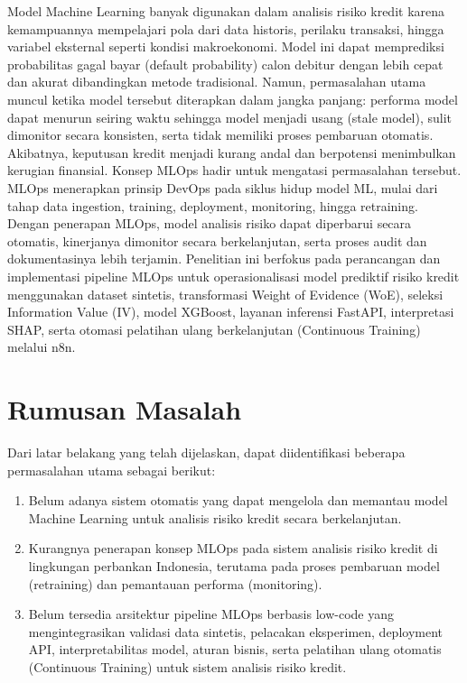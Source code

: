 Model Machine Learning banyak digunakan dalam analisis risiko kredit karena kemampuannya mempelajari pola dari data historis, perilaku transaksi, hingga variabel eksternal seperti kondisi makroekonomi. Model ini dapat memprediksi probabilitas gagal bayar (default probability) calon debitur dengan lebih cepat dan akurat dibandingkan metode tradisional.\cite{mlopsfinance2025} Namun, permasalahan utama muncul ketika model tersebut diterapkan dalam jangka panjang: performa model dapat menurun seiring waktu sehingga model menjadi usang (stale model), sulit dimonitor secara konsisten, serta tidak memiliki proses pembaruan otomatis. Akibatnya, keputusan kredit menjadi kurang andal dan berpotensi menimbulkan kerugian finansial. Konsep MLOps hadir untuk mengatasi permasalahan tersebut. MLOps menerapkan prinsip DevOps pada siklus hidup model ML, mulai dari tahap data ingestion, training, deployment, monitoring, hingga retraining. Dengan penerapan MLOps, model analisis risiko dapat diperbarui secara otomatis, kinerjanya dimonitor secara berkelanjutan, serta proses audit dan dokumentasinya lebih terjamin. Penelitian ini berfokus pada perancangan dan implementasi pipeline MLOps untuk operasionalisasi model prediktif risiko kredit menggunakan dataset sintetis, transformasi Weight of Evidence (WoE), seleksi Information Value (IV), model XGBoost, layanan inferensi FastAPI, interpretasi SHAP, serta otomasi pelatihan ulang berkelanjutan (Continuous Training) melalui n8n. \cite{mlopsbanking2025}

\section{Rumusan Masalah}
Dari latar belakang yang telah dijelaskan, dapat diidentifikasi beberapa permasalahan utama sebagai berikut:
\begin{enumerate}
    \item Belum adanya sistem otomatis yang dapat mengelola dan memantau model Machine Learning untuk analisis risiko kredit secara berkelanjutan.
    \item Kurangnya penerapan konsep MLOps pada sistem analisis risiko kredit di lingkungan perbankan Indonesia, terutama pada proses pembaruan model (retraining) dan pemantauan performa (monitoring).
    \item Belum tersedia arsitektur pipeline MLOps berbasis low-code yang mengintegrasikan validasi data sintetis, pelacakan eksperimen, deployment API, interpretabilitas model, aturan bisnis, serta pelatihan ulang otomatis (Continuous Training) untuk sistem analisis risiko kredit.
\end{enumerate}
